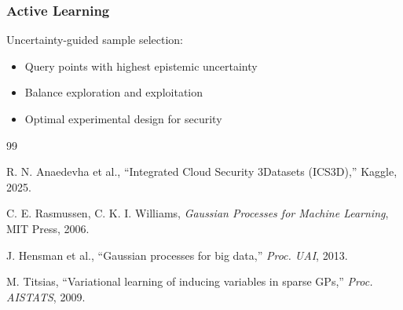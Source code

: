 \documentclass[12pt]{article}
\begin{document}
\subsubsection{Active Learning}
Uncertainty-guided sample selection:
\begin{itemize}
\item Query points with highest epistemic uncertainty
\item Balance exploration and exploitation
\item Optimal experimental design for security
\end{itemize}


\begin{thebibliography}{99}
\small

R. N. Anaedevha et al., ``Integrated Cloud Security 3Datasets (ICS3D),'' Kaggle, 2025.

C. E. Rasmussen, C. K. I. Williams, \textit{Gaussian Processes for Machine Learning}, MIT Press, 2006.

J. Hensman et al., ``Gaussian processes for big data,'' \textit{Proc. UAI}, 2013.

M. Titsias, ``Variational learning of inducing variables in sparse GPs,'' \textit{Proc. AISTATS}, 2009.


\end{thebibliography}
\end{document}
